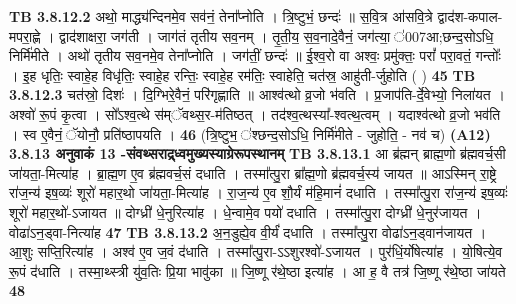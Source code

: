 \documentclass[17pt]{extarticle}
\begin{document}
{{{{{{{{{{{{{{{{{{{{{{                  \newline
                                \textbf{ TB 3.8.12.2} \newline
                  अथो॒ माद्ध्य॑न्दिनमे॒व सव॑नं॒ तेना᳚प्नोति । त्रि॒ष्टुभं॒ छन्दः॑ ॥ स॒वि॒त्र आ॑सवि॒त्रे द्वाद॑श-कपाल-मपरा॒ह्णे । द्वाद॑शाक्षरा॒ जग॑ती । जाग॑तं तृतीय सव॒नम् । तृ॒ती॒य॒ स॒व॒नादे॒वैनं॒ जग॑त्या॒ ॑007आ;छन्द॒सोऽधि॒ निर्मि॑मीते । अथो॑ तृतीय सव॒नमे॒व तेना᳚प्नोति । जग॑तीं॒ छन्दः॑ ॥ ई॒श्व॒रो वा अश्वः॒ प्रमु॑क्तः॒ परां᳚ परा॒वतं॒ गन्तोः᳚ । इ॒ह धृतिः॒ स्वाहे॒ह विधृ॑तिः॒ स्वाहे॒ह रन्तिः॒ स्वाहे॒ह रम॑तिः॒ स्वाहेति॒ चत॑स्र॒ आहु॑ती-र्जुहोति ( ) \textbf{ 45} \newline
                  \newline
                                \textbf{ TB 3.8.12.3} \newline
                  चत॑स्रो॒ दिशः॑ । दि॒ग्भिरे॒वैनं॒ परि॑गृह्णाति ॥ आश्व॑त्थो व्र॒जो भ॑वति । प्र॒जाप॑ति-र्दे॒वेभ्यो॒ निला॑यत । अश्वो॑ रू॒पं कृ॒त्वा । सो᳚ऽश्व॒त्थे स॑म्ॅवथ्स॒र-म॑तिष्ठत् । तद॑श्व॒त्थस्या᳚-श्वत्थ॒त्वम् । यदाश्व॑त्थो व्र॒जो भव॑ति । स्व ए॒वैनं॒ ॅयोनौ॒ प्रति॑ष्ठापयति । \textbf{ 46} \newline
                  \newline
                                    (त्रि॒ष्टुभ॒ ॑श्छन्द॒सोऽधि॒ निर्मि॑मीते - जुहोति॒ - नव॑ च) \textbf{(A12)} \newline \newline
                \textbf{ 3.8.13    अनुवाकं   13 -संवथ्सराद्र्ध्वमुख्यस्याग्रेरूपस्थानम्} \newline
                                \textbf{ TB 3.8.13.1} \newline
                  आ ब्र॑ह्मन् ब्राह्म॒णो ब्र॑ह्मवर्च॒सी जा॑यता॒-मित्या॑ह । ब्रा॒ह्म॒ण ए॒व ब्र॑ह्मवर्च॒सं दधाति । तस्मा᳚त्पु॒रा ब्रा᳚ह्म॒णो ब्र॑ह्मवर्च॒स्य॑ जायत ॥ आऽस्मिन् रा॒ष्ट्रे रा॑ज॒न्य॑ इष॒व्यः॑ शूरो॑ महार॒थो जा॑यता॒-मित्या॑ह । रा॒ज॒न्य॑ ए॒व शौ॒र्यं म॑हि॒मानं॑ दधाति । तस्मा᳚त्पु॒रा रा॑ज॒न्य॑ इष॒व्यः॑ शूरो॑ महार॒थो॑-ऽजायत ॥ दोग्ध्री॑ धे॒नुरित्या॑ह । धे॒न्वामे॒व पयो॑ दधाति । तस्मा᳚त्पु॒रा दोग्ध्री॑ धे॒नुर॑जायत । वोढा॑ऽन॒ड्वा-नित्या॑ह \textbf{ 47} \newline
                  \newline
                                \textbf{ TB 3.8.13.2} \newline
                  अ॒न॒डुह्ये॒व वी॒र्यं॑ दधाति । तस्मा᳚त्पु॒रा वोढा॑ऽन॒ड्वान॑जायत । आ॒शुः सप्ति॒रित्या॑ह । अश्व॑ ए॒व ज॒वं द॑धाति । तस्मा᳚त्पु॒रा-ऽऽशुरश्वो॑-ऽजायत । पुर॑धिं॒र्योषेत्या॑ह । यो॒षित्ये॒व रू॒पं द॑धाति । तस्मा॒थ्स्त्री यु॑व॒तिः प्रि॒या भावु॑का ॥ जि॒ष्णू र॑थे॒ष्ठा इत्या॑ह । आ ह॒ वै तत्र॑ जि॒ष्णू र॑थे॒ष्ठा जा॑यते \textbf{ 48} \newline
}}}}}}}}}}}}}}}}}}}}}}
\end{document}
